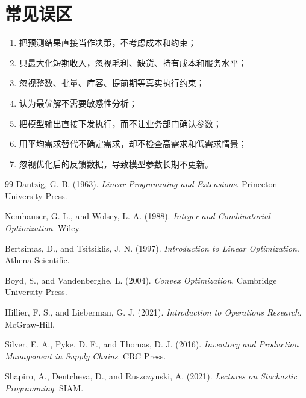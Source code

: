 \documentclass[UTF8,fontset=fandol,openany,zihao=-4]{ctexbook}
\begin{document}
\section*{常见误区}

\begin{enumerate}
  \item 把预测结果直接当作决策，不考虑成本和约束；
  \item 只最大化短期收入，忽视毛利、缺货、持有成本和服务水平；
  \item 忽视整数、批量、库容、提前期等真实执行约束；
  \item 认为最优解不需要敏感性分析；
  \item 把模型输出直接下发执行，而不让业务部门确认参数；
  \item 用平均需求替代不确定需求，却不检查高需求和低需求情景；
  \item 忽视优化后的反馈数据，导致模型参数长期不更新。
\end{enumerate}

\begin{thebibliography}{99}
Dantzig, G. B. (1963).
\newblock \emph{Linear Programming and Extensions}.
\newblock Princeton University Press.

Nemhauser, G. L., and Wolsey, L. A. (1988).
\newblock \emph{Integer and Combinatorial Optimization}.
\newblock Wiley.

Bertsimas, D., and Tsitsiklis, J. N. (1997).
\newblock \emph{Introduction to Linear Optimization}.
\newblock Athena Scientific.

Boyd, S., and Vandenberghe, L. (2004).
\newblock \emph{Convex Optimization}.
\newblock Cambridge University Press.

Hillier, F. S., and Lieberman, G. J. (2021).
\newblock \emph{Introduction to Operations Research}.
\newblock McGraw-Hill.

Silver, E. A., Pyke, D. F., and Thomas, D. J. (2016).
\newblock \emph{Inventory and Production Management in Supply Chains}.
\newblock CRC Press.

Shapiro, A., Dentcheva, D., and Ruszczynski, A. (2021).
\newblock \emph{Lectures on Stochastic Programming}.
\newblock SIAM.
\end{thebibliography}
\end{document}
